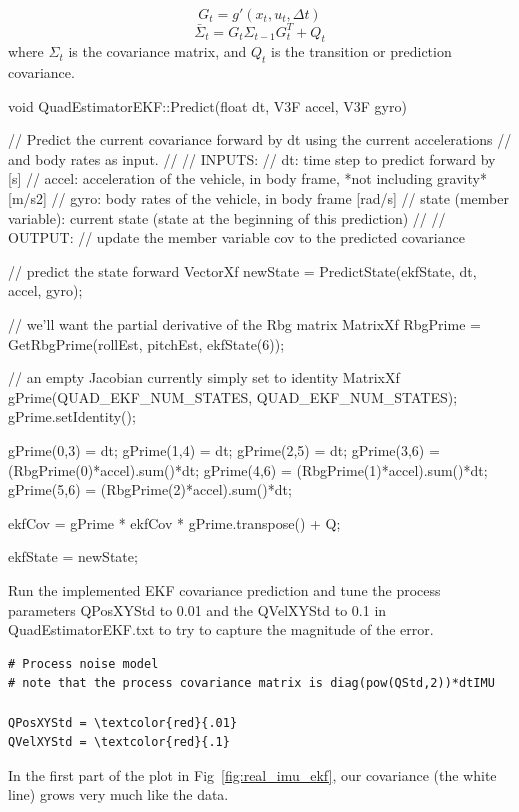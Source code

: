 \documentclass[letterpaper]{article}
\begin{document}
$$G_t = g'(x_t, u_t, \Delta t)$$
$$\bar{\Sigma}_t = G_t\Sigma_{t-1}G_t^T + Q_t$$
where $\Sigma_t$ is the covariance matrix, and $Q_t$ is the transition or prediction covariance.

\begin{CPP}
void QuadEstimatorEKF::Predict(float dt, V3F accel, V3F gyro)
{
    // Predict the current covariance forward by dt using the current accelerations 
    // and body rates as input.
    //
    // INPUTS: 
    //   dt: time step to predict forward by [s]
    //   accel: acceleration of the vehicle, in body frame, *not including gravity* [m/s2]
    //   gyro: body rates of the vehicle, in body frame [rad/s]
    //   state (member variable): current state (state at the beginning of this prediction)
    //   
    // OUTPUT:
    //   update the member variable cov to the predicted covariance

    // predict the state forward
    VectorXf newState = PredictState(ekfState, dt, accel, gyro);

    // we'll want the partial derivative of the Rbg matrix
    MatrixXf RbgPrime = GetRbgPrime(rollEst, pitchEst, ekfState(6));

    // an empty Jacobian currently simply set to identity
    MatrixXf gPrime(QUAD_EKF_NUM_STATES, QUAD_EKF_NUM_STATES);
    gPrime.setIdentity();

    gPrime(0,3) = dt;
    gPrime(1,4) = dt;
    gPrime(2,5) = dt;
    gPrime(3,6) = (RbgPrime(0)*accel).sum()*dt;
    gPrime(4,6) = (RbgPrime(1)*accel).sum()*dt;
    gPrime(5,6) = (RbgPrime(2)*accel).sum()*dt;

    ekfCov = gPrime * ekfCov * gPrime.transpose() + Q;

    ekfState = newState;
}
\end{CPP}

Run the implemented EKF covariance prediction and tune the process parameters QPosXYStd to 0.01 and the QVelXYStd to 0.1 in QuadEstimatorEKF.txt to try to capture the magnitude of the error. 

\begin{Verbatim}[frame=single, commandchars=\\\{\}]
# Process noise model
# note that the process covariance matrix is diag(pow(QStd,2))*dtIMU

QPosXYStd = \textcolor{red}{.01}
QVelXYStd = \textcolor{red}{.1}
\end{Verbatim}

In the first part of the plot in Fig~\ref{fig:real_imu_ekf}, our covariance (the white line) grows very much like the data.
\end{document}
